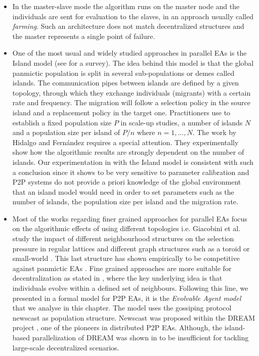 \begin{itemize}

\item In the master-slave mode the
algorithm runs on the master node and the individuals are sent for evaluation
to the slaves, in an approach usually called {\em farming}. Such an architecture does not match decentralized structures and the master represents a single point of failure. 

\item One of the most usual and widely studied approaches in parallel EAs is the Island model (see \cite{	cantu:parallelga} for a survey). The idea behind this model is that the global panmictic population is split in several sub-populations or demes called islands. The communication pipes between islands are defined by a given
topology, through which they exchange individuals (migrants) with a certain rate and frequency.   The migration will follow a selection policy in the source island and a replacement policy in the target one.
Practitioners use to establish a fixed population size $P$ in scale-up studies, a number of islands $N$
and a population size per island of $P/n$ where $n = 1,\dots,N$. 
The work by Hidalgo and Fern\'andez \cite{Fernandez:balancing} requires a special attention. They experimentally show how the algorithmic results are strongly dependent on the number of islands. Our experimentation in \cite{laredo2008:softcomputing} with the Island model is consistent with such a conclusion since it shows  to be very sensitive to parameter calibration and P2P systems do not provide a priori knowledge of the global environment that an island model would need in order to set parameters such as the number of islands, the population size per island and the migration rate. 

\item Most of the works regarding finer grained approaches for parallel EAs focus on the algorithmic effects of using different topologies  i.e. 
Giacobini et al. study the impact of different neighbourhood structures on the selection pressure in regular lattices \cite{giacobini:regular} and different graph structures such as a toroid \cite{giacobini:gecco04} or small-world \cite{giacobini:gecco05}. This last structure has shown empirically to be competitive against panmictic EAs \cite{preuss04ppsn, giacobini:evocop06}. Fine grained approaches are more suitable for decentralization as stated in \cite{upali:adaptive,laredo:selection}, where
the key underlying idea is that individuals evolve within a defined set of neighbours. Following this line, we presented in \cite{laredo:cec2008} a formal model for P2P EAs, it is the \emph{Evolvable Agent model} that we analyse in this chapter. The model uses the gossiping protocol newscast \cite{jelasity:newscast} as population structure. Newscast was proposed within the DREAM project \cite{arenas:dream}, one of the pioneers in distributed P2P EAs. Although, the island-based parallelization of DREAM was shown in \cite{laredo:empirical} to be insufficient for tackling large-scale decentralized scenarios. 
\end{itemize}

